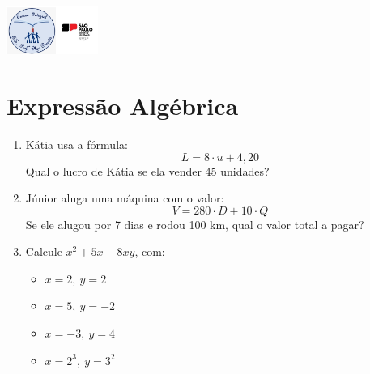 \documentclass[a4paper,landscape]{article}
\begin{document}
	\begin{minipage}[t]{0.49\textwidth}
		\begin{center}
			\includegraphics[width=3cm]{pei.jpg}
		\end{center}
		
		\section*{Expressão Algébrica}
		
		\begin{enumerate}
			\item Kátia usa a fórmula:  
			\[ L = 8 \cdot u + 4{,}20 \]
			Qual o lucro de Kátia se ela vender 45 unidades?
			
			\item Júnior aluga uma máquina com o valor:  
			\[ V = 280 \cdot D + 10 \cdot Q \]
			Se ele alugou por 7 dias e rodou 100 km, qual o valor total a pagar?
			
			\item Calcule \(x^2 + 5x - 8xy\), com:
			\begin{itemize}[label={}]
				\item \(x = 2,\ y = 2\)
				\item \(x = 5,\ y = -2\)
				\item \(x = -3,\ y = 4\)
				\item \(x = 2^3,\ y = 3^2\)
			\end{itemize}
		\end{enumerate}
	\end{minipage}
	
\end{document}
